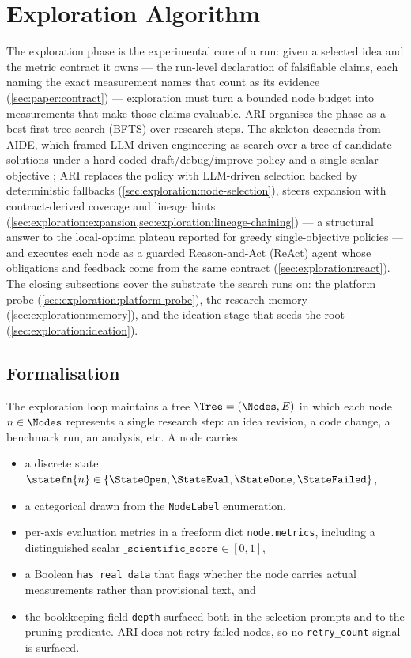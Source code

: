 \section{Exploration Algorithm}\label{sec:exploration}

The exploration phase is the experimental core of a run: given a
selected idea and the metric contract it owns --- the run-level
declaration of falsifiable claims, each naming the exact measurement
names that count as its evidence (\cref{sec:paper:contract}) ---
exploration must turn a bounded node budget into measurements that
make those claims evaluable. ARI organises the phase as a best-first
tree search (BFTS) over research steps. The skeleton descends from
AIDE, which framed LLM-driven engineering as search over a tree of
candidate solutions under a hard-coded draft/debug/improve policy and
a single scalar objective \cite{jiang2025aide}; ARI replaces the
policy with LLM-driven selection backed by deterministic fallbacks
(\cref{sec:exploration:node-selection}), steers expansion with
contract-derived coverage and lineage hints
(\cref{sec:exploration:expansion,sec:exploration:lineage-chaining})
--- a structural answer to the local-optima plateau reported for
greedy single-objective policies \cite{jiang2025aide} --- and
executes each node as a guarded Reason-and-Act (ReAct) agent whose
obligations and feedback come from the same contract
(\cref{sec:exploration:react}). The closing subsections cover the
substrate the search runs on: the platform probe
(\cref{sec:exploration:platform-probe}), the research memory
(\cref{sec:exploration:memory}), and the ideation stage that seeds
the root (\cref{sec:exploration:ideation}).

\subsection{Formalisation}\label{sec:exploration:formalization}

The exploration loop maintains a tree $\Tree=(\Nodes, E)$ in which
each node $n\in\Nodes$ represents a single research step: an idea
revision, a code change, a benchmark run, an analysis, etc. A node
carries

\begin{itemize}
  \item a discrete state $\statefn{n}\in\{\StateOpen,\StateEval,\StateDone,\StateFailed\}$,
  \item a categorical  drawn from the \texttt{NodeLabel}
        enumeration,
  \item per-axis evaluation metrics in a freeform dict
        \texttt{node.metrics}, including a distinguished scalar
        $\texttt{\_scientific\_score}\in[0,1]$,
  \item a Boolean \texttt{has\_real\_data} that flags whether the
        node carries actual measurements rather than provisional
        text, and
  \item the bookkeeping field \texttt{depth} surfaced both in the
        selection prompts and to the pruning predicate. ARI does not
        retry failed nodes, so no \texttt{retry\_count} signal is
        surfaced.
\end{itemize}

